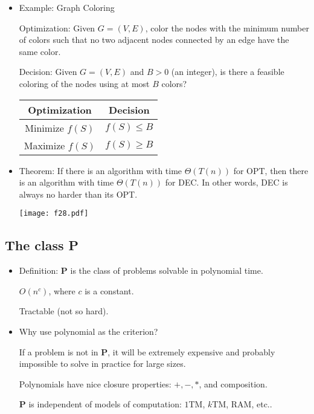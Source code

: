 \documentclass{article}
\begin{document}
\begin{itemize}

\item Example: Graph Coloring

Optimization: Given $G=(V,E)$, color the nodes with the minimum
number of colors such that no two adjacent nodes connected by an
edge have the same color.

Decision: Given $G=(V,E)$ and $B>0$ (an integer), is there a
feasible coloring of the nodes using at most $B$ colors?

\begin{center}
\begin{tabular}{c|c}
Optimization & Decision\\\hline
Minimize $f(S)$ & $f(S)\le B$\\\hline
Maximize $f(S)$ & $f(S)\ge B$
\end{tabular}
\end{center}

\item Theorem: If there is an algorithm with time $\Theta(T(n))$ for
OPT, then there is an algorithm with time $\Theta(T(n))$ for DEC.
In other words, DEC is always no harder than its OPT.

\vskip 0.25cm
\begin{center}
\texttt{[image: f28.pdf]}
\end{center}

\end{itemize}

\subsection{The class {\bf P}}

\begin{itemize}

\item Definition: {\bf P} is the class of problems solvable in
polynomial time. 

$O(n^c)$, where $c$ is a constant.

Tractable (not so hard).

\item Why use polynomial as the criterion?

If a problem is not in {\bf P}, it will be extremely expensive
and probably impossible to solve in practice for large sizes.

Polynomials have nice closure properties: $+, -, *$, and composition.

{\bf P} is independent of models of computation: $1$TM, $k$TM, RAM, etc..

\end{itemize}
\end{document}
